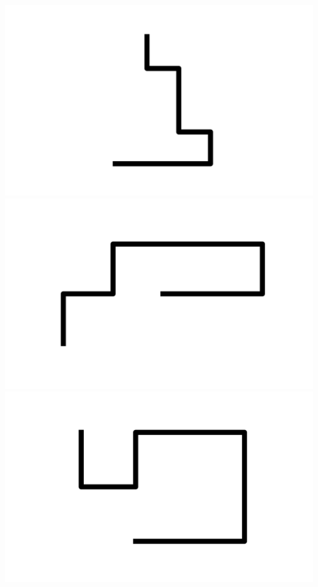 \documentclass[]{report}
\begin{document}
\includegraphics[scale=.1]{pictures/18/state_cluster_shapes_10.pdf} 
\includegraphics[scale=.1]{pictures/18/state_cluster_shapes_11.pdf} 
\includegraphics[scale=.1]{pictures/18/state_cluster_shapes_12.pdf} 
\end{document}
